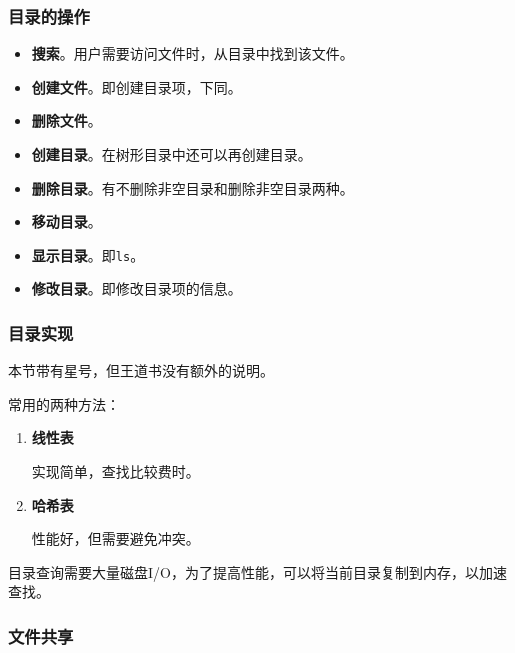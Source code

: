 \documentclass[12pt, a4paper, oneside]{ctexart}
\begin{document}
\subsubsection{目录的操作}

\begin{itemize}
  \item \textbf{搜索}。用户需要访问文件时，从目录中找到该文件。
  \item \textbf{创建文件}。即创建目录项，下同。
  \item \textbf{删除文件}。
  \item \textbf{创建目录}。在树形目录中还可以再创建目录。
  \item \textbf{删除目录}。有不删除非空目录和删除非空目录两种。
  \item \textbf{移动目录}。
  \item \textbf{显示目录}。即\verb|ls|。
  \item \textbf{修改目录}。即修改目录项的信息。
\end{itemize}

\subsubsection{目录实现}

本节带有星号，但王道书没有额外的说明。

常用的两种方法：
\begin{enumerate}
  \item {\bf 线性表}
  
  实现简单，查找比较费时。

  \item {\bf 哈希表}
  
  性能好，但需要避免冲突。
\end{enumerate}

目录查询需要大量磁盘I/O，为了提高性能，可以将当前目录复制到内存，以加速查找。

\subsubsection{文件共享}
\end{document}
